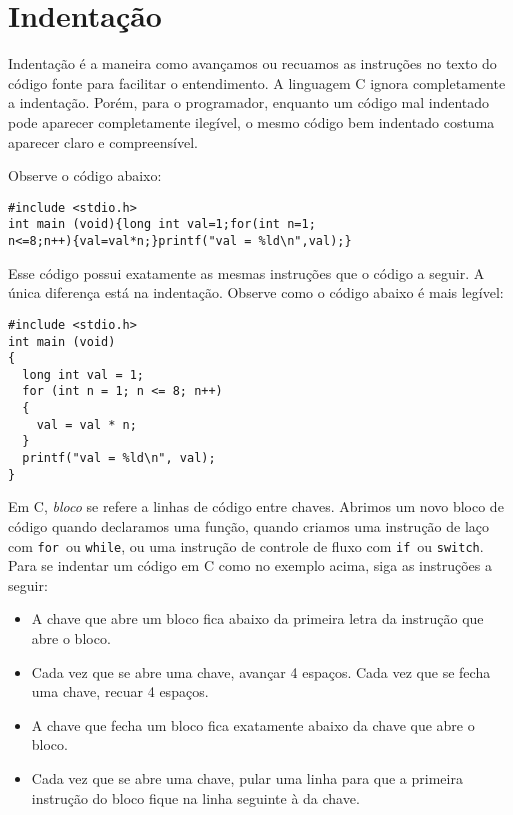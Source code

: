 \documentclass{book}
\newcommand{\IF}{{\tt if}}
\newcommand{\SWITCH}{{\tt switch}}
\newcommand{\FOR}{{\tt for}}
\newcommand{\WHILE}{{\tt while}}
\begin{document}

\chapter{Indentação}

Indentação é a maneira como avançamos ou recuamos as instruções no texto do código fonte para facilitar o entendimento. A linguagem C ignora completamente a indentação. Porém, para o programador, enquanto um código mal indentado pode aparecer completamente ilegível, o mesmo código bem indentado costuma aparecer claro e compreensível.

Observe o código abaixo: 

\begin{lstlisting}
#include <stdio.h> 
int main (void){long int val=1;for(int n=1; 
n<=8;n++){val=val*n;}printf("val = %ld\n",val);}
\end{lstlisting}

Esse código possui exatamente as mesmas instruções que o código a seguir. A única diferença está na indentação. Observe como o código abaixo é mais legível:

\begin{lstlisting}
#include <stdio.h>
int main (void)
{
  long int val = 1;
  for (int n = 1; n <= 8; n++)
  {
    val = val * n; 
  }
  printf("val = %ld\n", val);
}
\end{lstlisting}

\pagebreak

Em C, {\it bloco} se refere a linhas de código entre chaves. Abrimos um novo bloco de código quando declaramos uma função, quando criamos uma instrução de laço com \FOR\ ou \WHILE, ou uma instrução de controle de fluxo com \IF\ ou \SWITCH.
Para se indentar um código em C como no exemplo acima, siga as instruções a seguir:

\begin{itemize}
\item A chave que abre um bloco fica abaixo da primeira letra da instrução que abre o bloco.
\item Cada vez que se abre uma chave, avançar 4 espaços. Cada vez que se fecha uma chave, recuar 4 espaços.
\item A chave que fecha um bloco fica exatamente abaixo da chave que abre o bloco.
\item Cada vez que se abre uma chave, pular uma linha para que a primeira instrução do bloco fique na linha seguinte à da chave.
\end{itemize}
\end{document}

